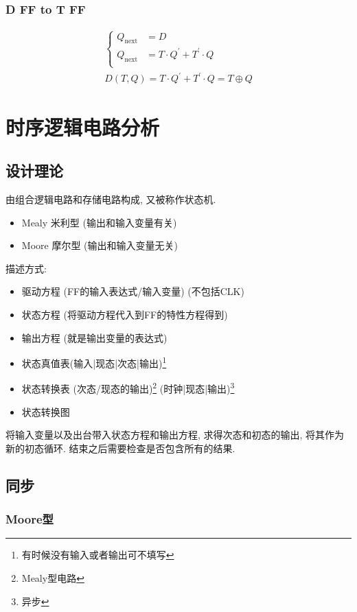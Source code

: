 \documentclass[scheme=chinese,a4paper]{report}
\begin{document}
\subsection{D FF to T FF}
\begin{align*}
    \begin{cases}
        Q_\text{next}&=D\\
        Q_\text{next}&=T\cdot Q ^\prime+ T ^\prime \cdot Q \\
    \end{cases}\\
    D(T,Q)=T\cdot Q ^\prime+ T ^\prime \cdot Q=T\oplus Q
\end{align*}
\chapter{时序逻辑电路分析}
\section{设计理论}
由组合逻辑电路和存储电路构成, 又被称作状态机. \par
\begin{itemize}
    \item Mealy 米利型 (输出和输入变量有关)
    \item Moore 摩尔型 (输出和输入变量无关)
\end{itemize}
描述方式:
\begin{itemize}
    \item 驱动方程 (FF的输入表达式/输入变量) (不包括CLK)
    \item 状态方程 (将驱动方程代入到FF的特性方程得到)
    \item 输出方程 (就是输出变量的表达式)
    \item 状态真值表(输入|现态|次态|输出)\footnote{有时候没有输入或者输出可不填写}
    \item 状态转换表 (次态/现态的输出)\footnote{Mealy型电路} (时钟|现态|输出)\footnote{异步}
    \item 状态转换图
\end{itemize}
将输入变量以及出台带入状态方程和输出方程, 求得次态和初态的输出, 将其作为新的初态循环. 结束之后需要检查是否包含所有的结果. 

\section{同步}

\subsection{Moore型}
\end{document}
